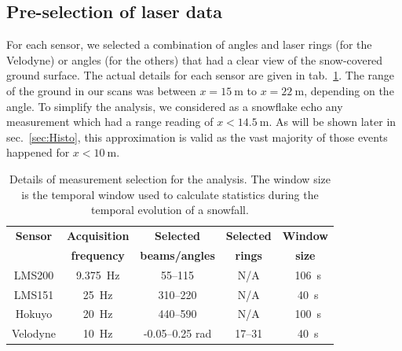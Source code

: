 \subsection{Pre-selection of laser data}
For each sensor, we selected a combination of angles and laser rings (for the Velodyne) or angles (for the others) that had a clear view of the snow-covered ground surface. The actual details for each sensor are given in tab.~\ref{tab:selectionScans}. The range of the ground in our scans was between $x = \SI{15}{\meter}$ to $x=\SI{22}{\meter}$, depending on the angle. To simplify the analysis, we considered as a snowflake echo any measurement which had a range reading of $x<\SI{14.5}{\meter}$. As will be shown later in sec.~\ref{sec:Histo}, this approximation is valid as the vast majority of those events happened for $x<\SI{10}{\meter}$. %

\begin{table}[htbp]
    \centering
    \begin{tabular}{|c|c|c|c|c|}
        \hline
        \textbf{Sensor}            & \textbf{Acquisition}  & \textbf{Selected}  & \textbf{Selected}  & \textbf{Window} \\
        \textbf{ }                     & \textbf{frequency}  & \textbf{beams/angles}  & \textbf{rings}  & \textbf{size} \\\hline
       LMS200               & \SI{9.375}{\Hz}                      & 55--115                                    & N/A                         & ~\SI{106}{\second}       \\\hline
        LMS151               & \SI{25}{\Hz}                           & 310--220                                  & N/A                         & ~\SI{40}{\second}        \\\hline
        Hokuyo               & \SI{20}{\Hz}                          & 440--590                                  & N/A                         & ~\SI{100}{\second}     \\\hline
        Velodyne             & \SI{10}{\Hz}                          & -0.05--0.25 rad                     & 17--31                   & ~\SI{40}{\second}      \\\hline
    \end{tabular}
    \caption{Details of measurement selection for the analysis. The window size is the temporal window used to calculate statistics during the temporal evolution of a snowfall.}
    \label{tab:selectionScans}
\end{table}

